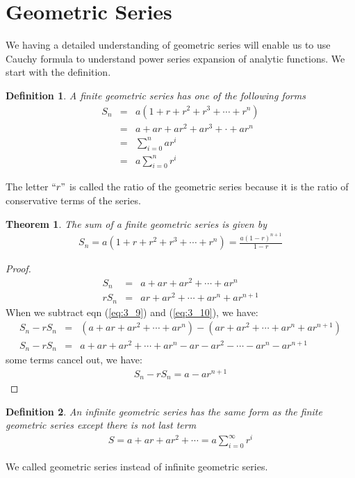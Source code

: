 \documentclass[11pt]{report}
\newcommand{\sps}{\\[0.2cm]}
\newcommand{\refn}[1]{(\ref{#1})}
\newcommand{\refx}[1]{\refn{eq:#1}}
\newtheorem{theorem}{Theorem}[chapter]
\newtheorem{definition}{Definition}[chapter]
\begin{document}
	\section{Geometric Series}
	We having a detailed understanding of geometric series will enable us to use Cauchy formula to understand power series expansion of analytic functions. We start with the definition.
	\begin{definition}
		A finite geometric series has one of the following forms
		\begin{eqnarray*}
			S_n &=& a(1+r+r^2+r^3+\cdots + r^n)\sps
			&=& a+ ar + ar^2 + ar^3 + \cdot + ar^n\sps
			&=& \sum_{i=0}^{n}ar^i\sps
			&=& a\sum_{i=0}^{n}r^i
		\end{eqnarray*}
	\end{definition}
	The letter $``r"$ is called the ratio of the geometric series because it is the ratio of conservative terms of the series.
	
	\begin{theorem}
		The sum of a finite geometric series is given by 
		\begin{eqnarray*}
			S_n = a(1+r+r^2+r^3+\cdots + r^n)= \frac{a(1-r)^{n+1}}{1-r}
		\end{eqnarray*}
	\end{theorem}
	\begin{proof}
		\begin{eqnarray}
			S_n &=& a+ar + ar^2 + \cdots + ar^n\sps \label{eq:3_9}
			rS_n &=& ar + ar^2 + \cdots + ar^n + ar^{n+1}\label{eq:3_10}
		\end{eqnarray}
		When we subtract eqn \refx{3_9} and \refx{3_10}, we have:
		\begin{eqnarray*}
			S_n - rS_n &=&(a+ar+ar^2+\cdots + ar^n) - (ar+ar^2+\cdots+ar^n+ar^{n+1})\sps
			S_n - rS_n &=& a + ar + ar^2 + \cdots + ar^n - ar - ar^2 - \cdots - ar^n - ar^{n+1}
		\end{eqnarray*}
		some terms cancel out, we have:
		\begin{eqnarray*}
			S_n - rS_n = a-ar^{n+1}
		\end{eqnarray*}
	\end{proof}
	
	\begin{definition}
		An infinite geometric series has the same form as the finite geometric series except there is not last term
		\begin{eqnarray*}
			S = a + ar + ar^2 + \cdots = a\sum_{i=0}^{\infty}r^i
		\end{eqnarray*}
	\end{definition}
	We called geometric series instead of infinite geometric series.
	
\end{document}
